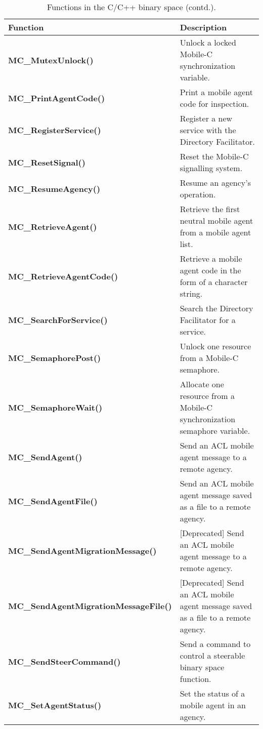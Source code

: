 \addtocounter{table}{-1}
\begin{table}[!hp]
\capstart
\begin{center}
\caption{Functions in the C/C++ binary space (contd.).}
\begin{tabular}{p{63 mm}p{97 mm}}
\hline
Function & Description \\
\hline
{\bf MC\_MutexUnlock()} \dotfill & Unlock a locked Mobile-C synchronization variable. \\
{\bf MC\_PrintAgentCode()} \dotfill & Print a mobile agent code for inspection. \\
{\bf MC\_RegisterService()} \dotfill &  Register a new service with the Directory Facilitator. \\
{\bf MC\_ResetSignal()} \dotfill &  Reset the Mobile-C signalling system. \\
{\bf MC\_ResumeAgency()} \dotfill &  Resume an agency's operation. \\
{\bf MC\_RetrieveAgent()} \dotfill & Retrieve the first neutral mobile agent from a mobile agent list. \\
{\bf MC\_RetrieveAgentCode()} \dotfill & Retrieve a mobile agent code in the form of a character string. \\
{\bf MC\_SearchForService()} \dotfill & Search the Directory Facilitator for a service. \\
{\bf MC\_SemaphorePost()} \dotfill & Unlock one resource from a Mobile-C semaphore. \\
{\bf MC\_SemaphoreWait()} \dotfill & Allocate one resource from a Mobile-C synchronization semaphore variable. \\
{\bf MC\_SendAgent()} \dotfill & Send an ACL mobile agent message to a remote agency. \\
{\bf MC\_SendAgentFile()} \dotfill & Send an ACL mobile agent message saved as a file to a remote agency. \\
{\bf MC\_SendAgentMigrationMessage()} \dotfill & [Deprecated] Send an ACL mobile agent message to a remote agency. \\
{\bf MC\_SendAgentMigrationMessageFile()} \dotfill & [Deprecated] Send an ACL mobile agent message saved as a file to a remote agency. \\
{\bf MC\_SendSteerCommand()} \dotfill & Send a command to control a steerable binary space function. \\
{\bf MC\_SetAgentStatus()} \dotfill & Set the status of a mobile agent in an agency. \\

\end{tabular}
\end{center}
\end{table}
